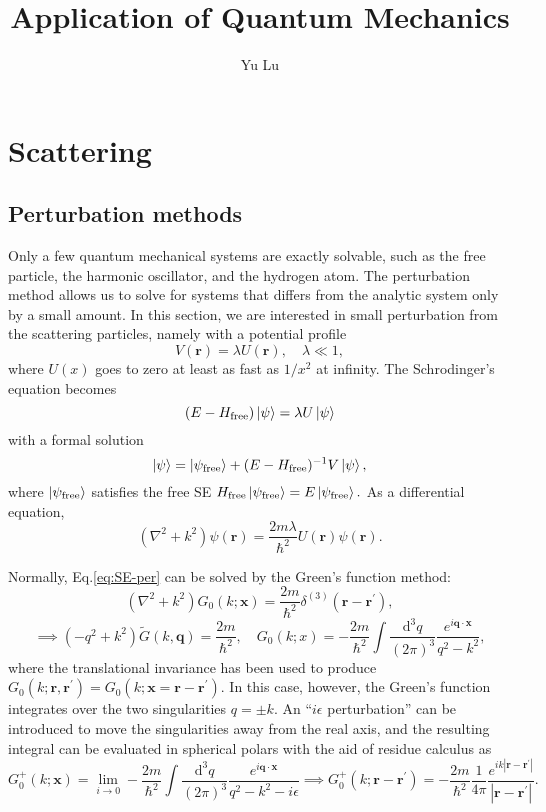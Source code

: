 \documentclass{article}
\title{Application of Quantum Mechanics}
\author{Yu Lu}
\theoremstyle{nonumberplain}
\begin{document}
\maketitle
\section{Scattering}
\subsection{Perturbation methods}
Only a few quantum mechanical systems are exactly solvable, such as the free particle, the harmonic oscillator, and the hydrogen atom. The perturbation method allows us to solve for systems that differs from the analytic system only by a small amount. In this section, we are interested in small perturbation from the scattering particles, namely with a potential profile
\[
    V(\mathbf{r} ) = \lambda U(\mathbf{r}), \quad \lambda \ll 1,
\]
where $U(x)$ goes to zero at least as fast as $1 / x^2$ at infinity. The Schrodinger's equation becomes
\[
    (E - H_{\mathrm{free} }) \ket{\psi} = \lambda U \ket{\psi}
\]
with a formal solution 
\[
    \ket{\psi } = \ket{\psi_{\mathrm{free} }} + (E - H_{\mathrm{free} })^{-1} V \ket{\psi},
\]
where $\ket{\psi_{\mathrm{free} }}$ satisfies the free SE $ H_{\mathrm{free}}\ket{\psi_{\mathrm{free} }} = E\ket{\psi_{\mathrm{free} }}.$
As a differential equation,
\begin{equation}
    \label{eq:SE-per}
    \left(\nabla^{2} + k^{2} \right) \psi(\mathbf{r} ) 
    = \frac{2 m \lambda }{\hbar ^{2} } U(\mathbf{r} ) \psi(\mathbf{r} ). 
\end{equation}

Normally, Eq.\eqref{eq:SE-per} can be solved by the Green's function method:
\[
    \left(\nabla^{2} + k^{2} \right) G_0(k;\mathbf{x}) = \frac{2m}{\hbar ^{2} }\delta^{(3)} (\mathbf{r} - \mathbf{r^\prime } ), 
\]
\[
    \implies (-q ^{2}  + k^{2} )\tilde{G}(k, \mathbf{q} ) = \frac{2m}{\hbar^{2} }, 
    \quad 
    G_0 (k;x) = -\frac{2m}{\hbar ^{2} } \int \frac{\mathrm{d} ^3 q}{(2\pi )^3} \frac{e^{i \mathbf{q} \cdot \mathbf{x} }}{q ^{2} - k^{2} },
\]
where the translational invariance has been used to produce $G_0(k;\mathbf{r}, \mathbf{r^\prime } ) = G_0(k;\mathbf{x} = \mathbf{r} -\mathbf{r^\prime } ).$
In this case, however, the Green's function integrates over the two singularities $q = \pm k.$ An ``$i \epsilon$ perturbation'' can be introduced to move the singularities away from the real axis, and the resulting integral can be evaluated in spherical polars with the aid of residue calculus as 
\[
    G_0^{+} (k;\mathbf{x} ) 
    = \lim_{i \to 0} -\frac{2m}{\hbar ^{2} }\int \frac{\mathrm{d} ^3 q}{(2 \pi )^3} \frac{e^{i \mathbf{q} \cdot \mathbf{x} }}{q ^{2} - k^{2}  - i\epsilon }
    \implies  
    \boxed{
    G_0^{+} (k;\mathbf{r} - \mathbf{r^\prime }  )
    = -\frac{2m}{\hbar ^{2} }\frac{1}{4\pi } \frac{e^{ik \left\vert \mathbf{r} -\mathbf{r^\prime }  \right\vert }}{\left\vert \mathbf{r} -\mathbf{r^\prime }  \right\vert }.}
\]
\end{document}
